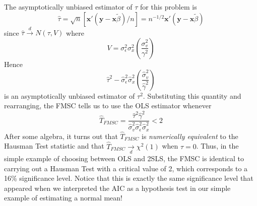 \documentclass[12pt]{article}
\theoremstyle{definition}
\begin{document}
The asymptotically unbiased estimator of $\tau$ for this problem is 
  $$\widehat{\tau} = \sqrt{n} \left[\mathbf{x}'(\mathbf{y} - \mathbf{x}\widetilde{\beta})/n\right] = n^{-1/2}\mathbf{x}'(\mathbf{y} - \mathbf{x}\widetilde{\beta})$$ 
since $\widehat{\tau} \overset{d}{\rightarrow} N(\tau, V)$ where
    $$V = \sigma^2_\epsilon \sigma^2_x \left( \frac{\sigma^2_v}{\gamma^2}\right)$$
Hence
	$$\widehat{\tau}^2 - \widehat{\sigma}_\epsilon^2\widehat{\sigma}_x^2 \left(\frac{\widehat{\sigma}_v^2}{\widehat{\gamma}^2}\right)$$
is an asymptotically unbiased estimator of $\tau^2$. Substituting this quantity and rearranging, the FMSC tells us to use the OLS estimator whenever
	$$\widehat{T}_{FMSC} = \frac{\widehat{\tau}^2 \widehat{\gamma}^2}{\widehat{\sigma}_v^2 \widehat{\sigma}_\epsilon^2 \widehat{\sigma}_x^2} < 2$$
After some algebra, it turns out that $\widehat{T}_{FMSC}$ is \emph{numerically equivalent} to the Hausman Test statistic and that $\widehat{T}_{FMSC} \underset{d}{\rightarrow} \chi^2(1)$ when $\tau = 0$. Thus, in the simple example of choosing between OLS and 2SLS, the FMSC is identical to carrying out a Hausman Test with a critical value of 2, which corresponds to a 16\% significance level. Notice that this is exactly the same significance level that appeared when we interpreted the AIC as a hypothesis test in our simple example of estimating a normal mean! 
\end{document}
